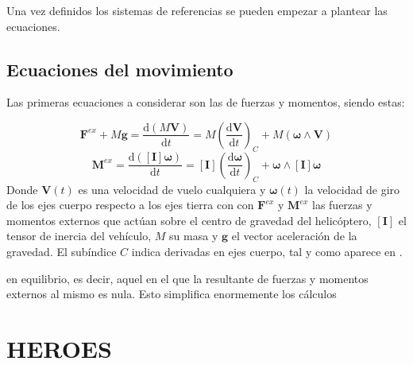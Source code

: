 Una vez definidos los sistemas de referencias se pueden empezar a plantear las ecuaciones.

\subsection{Ecuaciones del movimiento}

Las primeras ecuaciones a considerar  son las de fuerzas y momentos, siendo estas:

\begin{equation}
\mathrm{\textbf{F}}^{ex}+M\mathrm{\textbf{g}}=\frac{\mathrm{d}(M\mathrm{\textbf{V}})}{\mathrm{d}t}=M\left(\frac{\mathrm{d\textbf{V}}}{\mathrm{d}t}\right)_{C}+M(\boldsymbol{\omega}\wedge\mathrm{\textbf{V}})
\end{equation}
\begin{equation}
\mathrm{\textbf{M}}^{ex}=\frac{\mathrm{d}([\mathrm{\textbf{I}}]\boldsymbol{\omega})}{\mathrm{d}t}=[\mathrm{\textbf{I}}]\left(\frac{\mathrm{d}\boldsymbol{\omega}}{\mathrm{d}t}\right)_C+\boldsymbol{\omega}\wedge[\mathrm{\textbf{I}}]\boldsymbol{\omega}
\end{equation}
Donde $\mathrm{\textbf{V}}(t)$ es una velocidad de vuelo cualquiera y $\boldsymbol{\omega}(t)$ la velocidad de giro de los ejes cuerpo respecto a los ejes tierra con con $\mathrm{\textbf{F}}^{ex}$ y $\mathrm{\textbf{M}}^{ex}$ las fuerzas y momentos externos que actúan sobre el centro de gravedad del helicóptero, $[\mathrm{\textbf{I}}]$ el tensor de inercia del vehículo, $M$ su masa y $\mathrm{\textbf{g}}$ el vector aceleración de la gravedad. El subíndice $C$ indica derivadas en ejes cuerpo, tal y como aparece en \citet{Cuerva}.

 en equilibrio, es decir, aquel en el que la resultante de fuerzas y momentos externos al mismo es nula. Esto simplifica enormemente los cálculos
\section[\textbf{HE}licopter and \textbf{RO}tor \textbf{E}quilibrium and \textbf{S}tability toolbox]{HEROES}

